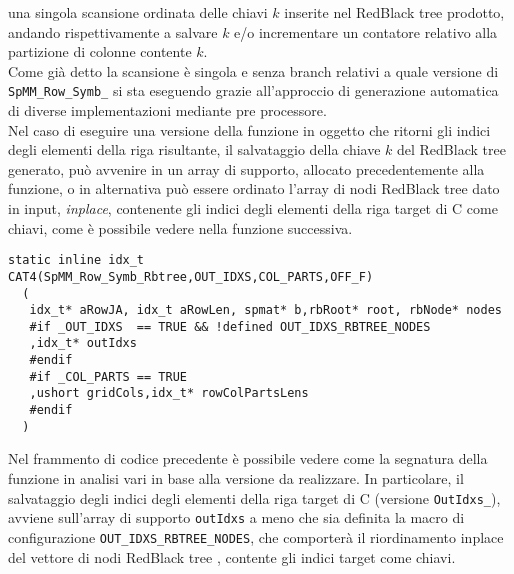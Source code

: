 una singola scansione ordinata delle chiavi $k$ inserite nel RedBlack tree prodotto, andando rispettivamente 
a salvare $k$ e/o incrementare un contatore relativo alla partizione di colonne contente $k$.\\
Come già detto la scansione è singola e senza branch relativi a quale versione di \\ \verb|SpMM_Row_Symb_| si sta eseguendo grazie all'approccio
di generazione automatica di diverse implementazioni mediante pre processore.\\
\label{OUT_IDXS_RBTREE_NODES}
Nel caso di eseguire una versione della funzione in oggetto
 che ritorni gli indici degli elementi \nnz della riga risultante, %
 il salvataggio della chiave $k$ del RedBlack tree generato,
può avvenire in un array di supporto, allocato precedentemente alla funzione, o 
in alternativa può essere ordinato l'array di nodi RedBlack tree dato in input, \emph{inplace}, 
contenente gli indici degli elementi \nnz della riga target di C come chiavi,
come è possibile vedere nella funzione successiva.\\
\begin{lstlisting}
static inline idx_t CAT4(SpMM_Row_Symb_Rbtree,OUT_IDXS,COL_PARTS,OFF_F)
  (
   idx_t* aRowJA, idx_t aRowLen, spmat* b,rbRoot* root, rbNode* nodes
   #if _OUT_IDXS  == TRUE && !defined OUT_IDXS_RBTREE_NODES 
   ,idx_t* outIdxs
   #endif
   #if _COL_PARTS == TRUE
   ,ushort gridCols,idx_t* rowColPartsLens
   #endif
  )
\end{lstlisting}
Nel frammento di codice precedente è possibile vedere come la segnatura della funzione in analisi vari in base alla versione da realizzare.
In particolare, il salvataggio degli indici \nnz degli elementi della riga target di C (versione \verb|OutIdxs_|), avviene sull'array di supporto 
\verb|outIdxs| a meno che sia definita la macro di configurazione \verb|OUT_IDXS_RBTREE_NODES|, che comporterà il riordinamento inplace del vettore di 
nodi RedBlack tree , contente gli indici target come chiavi.\\


